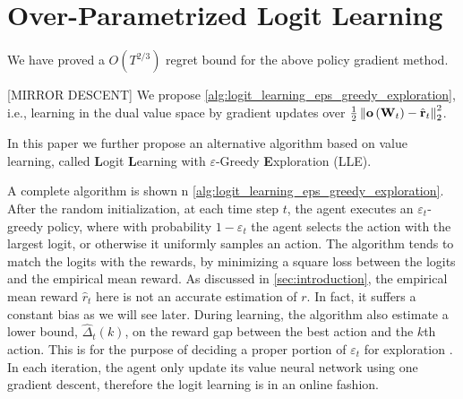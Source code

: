 \section{Over-Parametrized Logit Learning}
\label{sec:logit_learning}

We have proved a $O(T^{2/3})$ regret bound for the above policy gradient method.

[MIRROR DESCENT]
We propose \cref{alg:logit_learning_eps_greedy_exploration}, i.e., learning in the dual value space by gradient updates over $\frac{1}{2} \left\| {\mathbf{o}}\left( {\mathbf{W}}_t\right) - \hat{{\mathbf{r}}}_t \right\|_2^2$. 


In this paper we further propose an alternative algorithm based on value learning, called {\bf L}ogit {\bf L}earning with $\varepsilon$-Greedy {\bf E}xploration (LLE).



A complete algorithm is shown n \cref{alg:logit_learning_eps_greedy_exploration}. 
After the random initialization, at each time step $t$, the agent executes an $\varepsilon_t$-greedy policy, where with probability $1 - \varepsilon_t$ the agent selects the action with the largest logit, or otherwise it uniformly samples an action.
The algorithm tends to match the logits with the rewards, by minimizing a square loss between the logits and the empirical mean reward.
As discussed in \ref{sec:introduction}, the empirical mean reward $\hat{r}_t$ here is not an accurate estimation of $r$. In fact, it suffers a constant bias as we will see later.
During learning, the algorithm also estimate a lower bound, $\hat{\Delta}_t(k)$, on the reward gap between the best action and the $k$th action. 
This is for the purpose of deciding a proper portion of $\varepsilon_t$ for exploration \citep{seldin2017improved}.
In each iteration, the agent only update its value neural network using one gradient descent, therefore the logit learning is in an online fashion.


